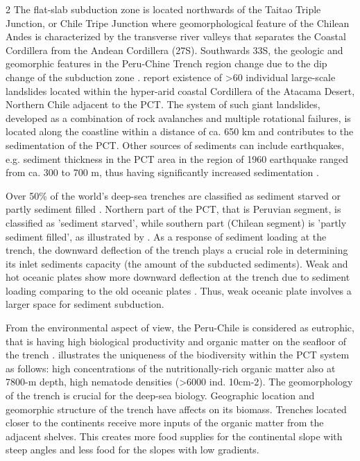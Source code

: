 \documentclass[11pt,a4paper]{report}
\begin{document}
\begin{multicols}{2}
The flat-slab subduction zone is located northwards of the Taitao Triple Junction, or Chile Tripe Junction \cite{Behrmann} where geomorphological feature of the Chilean Andes is characterized by the transverse river valleys that separates the Coastal Cordillera from the Andean Cordillera (27\degree\space S). Southwards 33\degree\space S, the geologic and geomorphic features in the Peru-Chine Trench region change due to the dip change of the subduction zone \cite{CecioniPineda}. \cite{Matheretal2014} report existence of >60 individual large-scale landslides located within the hyper-arid coastal Cordillera\index[places]{} of the Atacama Desert, Northern Chile adjacent to the \ac{PCT}. The system of such giant landslides, developed as a combination of rock avalanches and multiple rotational failures, is located along the coastline within a distance of ca. 650 km and contributes to the sedimentation of the \ac{PCT}. Other sources of sediments can include earthquakes, e.g. sediment thickness in the \ac{PCT} area in the region of 1960 earthquake ranged from ca. 300 to 700 m, thus having significantly increased sedimentation \cite{PrinceKulm}. 

Over 50\% of the world's deep-sea trenches are classified as sediment starved or partly sediment filled \cite{Geersenetal2018}. Northern part of the \ac{PCT}, that is Peruvian segment, is classified as 'sediment starved', while southern part (Chilean segment) is 'partly sediment filled', as illustrated by \cite{Geersen2019}. As a response of sediment loading at the trench, the downward deflection of the trench plays a crucial role in determining its inlet sediments capacity (the amount of the subducted sediments). Weak and hot oceanic plates show more downward deflection at the trench due to sediment loading comparing to the old oceanic plates \cite{ContrerasOsses2010}. Thus, weak oceanic plate involves a larger space for sediment subduction. 

From the environmental aspect of view, the Peru-Chile is considered as eutrophic, that is having high biological productivity and organic matter on the seafloor of the trench \cite{Laceyetal2016}. \cite{Gambietal2003} illustrates the uniqueness of the biodiversity within the \ac{PCT} system as follows: high concentrations of the nutritionally-rich organic matter also at 7800-m depth, high nematode densities (>6000 ind. 10cm-2). The geomorphology of the trench is crucial for the deep-sea biology. Geographic location and geomorphic structure of the trench have affects on its biomass. Trenches located closer to the continents receive more inputs of the organic matter from the adjacent shelves. This creates more food supplies for the continental slope with steep angles and less food for the slopes with low gradients. 


\end{multicols}
\end{document}
